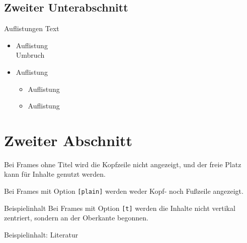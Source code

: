 \documentclass{sdqbeamer}
\begin{document}
\subsection{Zweiter Unterabschnitt}
\begin{frame}{Auflistungen}
  Text
  \begin{itemize}
    \item Auflistung\\ Umbruch
    \item Auflistung
    \begin{itemize}
      \item Auflistung
      \item Auflistung
    \end{itemize}
  \end{itemize}
\end{frame}

\section{Zweiter Abschnitt}

\begin{frame}
        Bei Frames ohne Titel wird die Kopfzeile nicht angezeigt, und  
    der freie Platz kann für Inhalte genutzt werden.
\end{frame}

\begin{frame}[plain]
    Bei Frames mit Option \texttt{[plain]} werden weder Kopf- noch Fußzeile angezeigt.
\end{frame}

\begin{frame}[t]{Beispielinhalt}
    Bei Frames mit Option \texttt{[t]} werden die Inhalte nicht vertikal zentriert, sondern an der Oberkante begonnen.
\end{frame}


\begin{frame}{Beispielinhalt: Literatur}
\end{frame}
\end{document}
